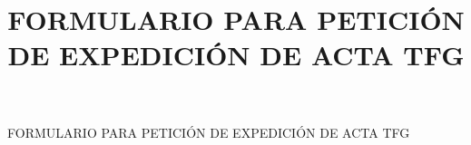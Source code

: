 \title{FORMULARIO PARA PETICIÓN DE EXPEDICIÓN DE ACTA TFG}        %
\date{}                                            %


\pagestyle{empty}

% 


% 

\Large{FORMULARIO PARA PETICIÓN DE EXPEDICIÓN DE ACTA TFG}

\vspace{1cm}

